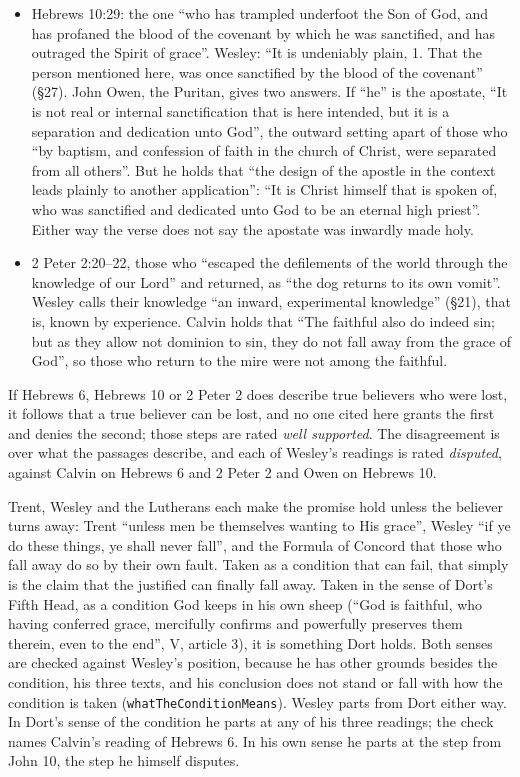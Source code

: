 \documentclass[11pt]{article}
\begin{document}
\begin{itemize}
  \item Hebrews 10:29: the one “who has trampled underfoot the Son of God, and has profaned the blood of the covenant by which he was sanctified, and has outraged the Spirit of grace”. Wesley: “It is undeniably plain, 1. That the person mentioned here, was once sanctified by the blood of the covenant” (§27). John Owen, the Puritan, gives two answers. If “he” is the apostate, “It is not real or internal sanctification that is here intended, but it is a separation and dedication unto God”, the outward setting apart of those who “by baptism, and confession of faith in the church of Christ, were separated from all others”. But he holds that “the design of the apostle in the context leads plainly to another application”: “It is Christ himself that is spoken of, who was sanctified and dedicated unto God to be an eternal high priest”. Either way the verse does not say the apostate was inwardly made holy.
  \item 2 Peter 2:20–22, those who “escaped the defilements of the world through the knowledge of our Lord” and returned, as “the dog returns to its own vomit”. Wesley calls their knowledge “an inward, experimental knowledge” (§21), that is, known by experience. Calvin holds that “The faithful also do indeed sin; but as they allow not dominion to sin, they do not fall away from the grace of God”, so those who return to the mire were not among the faithful.
\end{itemize}
  If Hebrews 6, Hebrews 10 or 2 Peter 2 does describe true believers who were   lost, it follows that a true believer can be lost, and no one cited here grants   the first and denies the second; those steps are rated \emph{well supported}. The   disagreement is over what the passages describe, and each of Wesley’s readings   is rated \emph{disputed}, against Calvin on Hebrews 6 and 2 Peter 2 and Owen on   Hebrews 10.

Trent, Wesley and the Lutherans each make the promise hold unless the believer turns away: Trent “unless men be themselves wanting to His grace”, Wesley “if ye do these things, ye shall never fall”, and the Formula of Concord that those who fall away do so by their own fault. Taken as a condition that can fail, that simply is the claim that the justified can finally fall away. Taken in the sense of Dort’s Fifth Head, as a condition God keeps in his own sheep (“God is faithful, who having conferred grace, mercifully confirms and powerfully preserves them therein, even to the end”, V, article 3), it is something Dort holds. Both senses are checked against Wesley’s position, because he has other grounds besides the condition, his three texts, and his conclusion does not stand or fall with how the condition is taken (\texttt{what\allowbreak{}The\allowbreak{}Condition\allowbreak{}Means}). Wesley parts from Dort either way. In Dort’s sense of the condition he parts at any of his three readings; the check names Calvin’s reading of Hebrews 6. In his own sense he parts at the step from John 10, the step he himself disputes.
\end{document}
